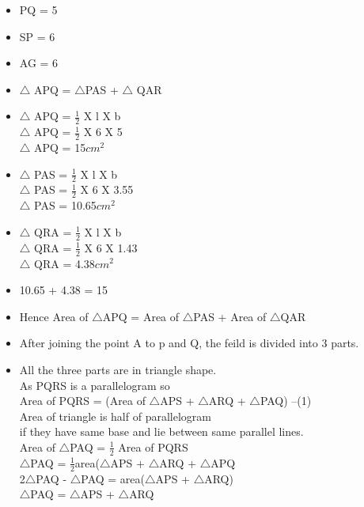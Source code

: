 \documentclass[journal,12pt,twocolumn]{IEEEtran}
\begin{document}
\begin{enumerate}[label=\arabic*]
\begin{itemize}
\item PQ = 5\\
\item SP = 6\\
\item AG = 6\\
\item$\triangle$ APQ = $\triangle$PAS + $\triangle$ QAR\\ 
\item$\triangle$ APQ = $\frac{1}{2}$ X l X b\\
$\triangle$ APQ = $\frac{1}{2}$ X 6 X 5\\
$\triangle$ APQ = 15$cm^2$
\item$\triangle$ PAS = $\frac{1}{2}$ X l X b\\
$\triangle$ PAS = $\frac{1}{2}$ X 6 X 3.55\\
$\triangle$ PAS = 10.65$cm^2$\\
\item$\triangle$ QRA = $\frac{1}{2}$ X l X b\\
$\triangle$ QRA = $\frac{1}{2}$ X 6 X 1.43\\
$\triangle$ QRA = 4.38$cm^2$\\
\item 10.65 + 4.38 = 15
\item Hence Area of $\triangle$APQ = Area of $\triangle$PAS + Area of $\triangle$QAR\\

\item  After joining the point A to p and Q, the feild is divided into 3 parts.\\
\item All the three parts are in triangle shape.\\
As PQRS is a parallelogram so\\

Area of PQRS = (Area of $\triangle$APS + $\triangle$ARQ + $\triangle$PAQ) --(1)\\
Area of triangle is half of parallelogram\\
if they have same base and lie between same parallel lines. \\
Area of $\triangle$PAQ = $\frac{1}{2}$ Area of PQRS\\
$\triangle$PAQ = $\frac{1}{2}$area($\triangle$APS + $\triangle$ARQ + $\triangle$APQ\\
2$\triangle$PAQ - $\triangle$PAQ = area($\triangle$APS + $\triangle$ARQ)\\
$\triangle$PAQ = $\triangle$APS + $\triangle$ARQ\\


\end{itemize}
\end{enumerate}
\end{document}

